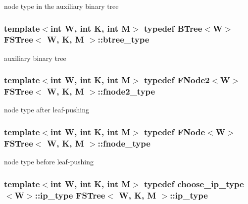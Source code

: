 node type in the auxiliary binary tree 

\hypertarget{classFSTree_a33535253397298880117e194d531f9f6}{
\subsubsection[{btree\-\_\-type}]{\setlength{\rightskip}{0pt plus 5cm}template$<$int W, int K, int M$>$ typedef {\bf B\-Tree}$<${\bf W}$>$ {\bf F\-S\-Tree}$<$ {\bf W}, K, M $>$\-::{\bf btree\-\_\-type}\hspace{0.3cm}{\ttfamily [private]}}}\label{classFSTree_a33535253397298880117e194d531f9f6}


auxiliary binary tree 

\hypertarget{classFSTree_ae109ec54da0c7eb682ab08c8f8bc615c}{
\subsubsection[{fnode2\-\_\-type}]{\setlength{\rightskip}{0pt plus 5cm}template$<$int W, int K, int M$>$ typedef {\bf F\-Node2}$<${\bf W}$>$ {\bf F\-S\-Tree}$<$ {\bf W}, K, M $>$\-::{\bf fnode2\-\_\-type}\hspace{0.3cm}{\ttfamily [private]}}}\label{classFSTree_ae109ec54da0c7eb682ab08c8f8bc615c}


node type after leaf-\/pushing 

\hypertarget{classFSTree_a67d384ab5a196299d83dde842299fe7f}{
\subsubsection[{fnode\-\_\-type}]{\setlength{\rightskip}{0pt plus 5cm}template$<$int W, int K, int M$>$ typedef {\bf F\-Node}$<${\bf W}$>$ {\bf F\-S\-Tree}$<$ {\bf W}, K, M $>$\-::{\bf fnode\-\_\-type}\hspace{0.3cm}{\ttfamily [private]}}}\label{classFSTree_a67d384ab5a196299d83dde842299fe7f}


node type before leaf-\/pushing 

\hypertarget{classFSTree_a4766ee89821315425e2c6090bd0a0245}{
\subsubsection[{ip\-\_\-type}]{\setlength{\rightskip}{0pt plus 5cm}template$<$int W, int K, int M$>$ typedef {\bf choose\-\_\-ip\-\_\-type}$<${\bf W}$>$\-::{\bf ip\-\_\-type} {\bf F\-S\-Tree}$<$ {\bf W}, K, M $>$\-::{\bf ip\-\_\-type}\hspace{0.3cm}{\ttfamily [private]}}}\label{classFSTree_a4766ee89821315425e2c6090bd0a0245}


